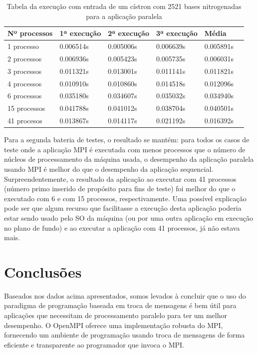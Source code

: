 \documentclass[a4paper,10pt]{article}
\begin{document}
\begin{table}[!htb]
\begin{tabular}{| l | l | l | l | l | p{5cm} |} 
\hline
Nº processos & 1ª execução & 2ª execução & 3ª execução & Média\\ \hline
1 processo & 0.006514s & 0.005006s & 0.006639s & 0.005891s \\\hline
2 processos & 0.006936s & 0.005423s &  0.005735s & 0.006031s \\\hline
3 processos & 0.011321s & 0.013001s & 0.011141s & 0.011821s \\\hline
4 processos & 0.010910s & 0.010860s & 0.014518s & 0.012096s \\\hline
6 processos & 0.035180s & 0.034607s & 0.035032s & 0.034940s \\\hline
15 processos & 0.041788s & 0.041012s & 0.038704s & 0.040501s \\\hline
41 procesos & 0.013867s & 0.014117s & 0.021192s & 0.016392s \\\hline
\end{tabular}
\caption{Tabela da execução com entrada de um cístron com 2521 bases nitrogenadas para a aplicação paralela}
\end{table}


Para a segunda bateria de testes, o resultado se mantém: para todos os casos de teste onde a aplicação MPI é executada com menos processos que o número de núcleos de processamento da máquina usada, o desempenho da aplicação paralela usando MPI é melhor do que o desempenho da aplicação sequencial. Surpreendentemente, o resultado da aplicação ao executar com 41 processos (número primo inserido de propósito para fins de teste) foi melhor do que o executado com 6 e com 15 processos, respectivamente. Uma possível explicação pode ser que algum recurso que facilitasse a execução desta aplicação poderia estar sendo usado pelo SO da máquina (ou por uma outra aplicação em execução no plano de fundo) e ao executar a aplicação com 41 processos, já não estava mais.

\section{Conclusões}

Baseados nos dados acima apresentados, somos levados à concluir que o uso do paradigma de programação baseada em troca de mensagens é bem útil para aplicações que necessitam de processamento paralelo para ter um melhor desempenho. O OpenMPI oferece uma implementação robusta do MPI, fornecendo um ambiente de programação usando troca de mensagens de forma eficiente e transparente ao programador que invoca o MPI.





\end{document}
